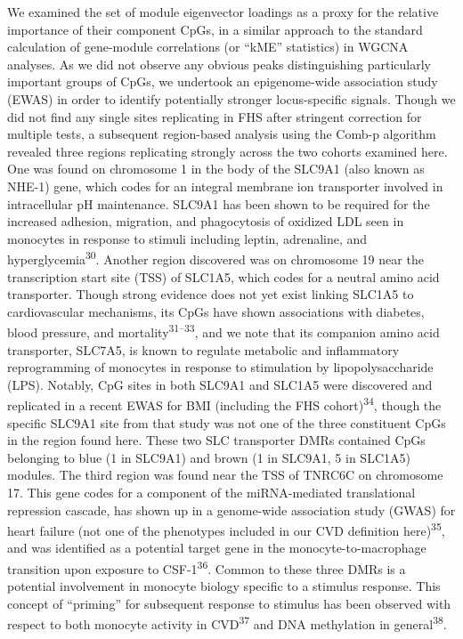 \documentclass[]{article}
\theoremstyle{definition}
\theoremstyle{definition}
\theoremstyle{definition}
\theoremstyle{remark}
\begin{document}
We examined the set of module eigenvector loadings as a proxy for the
relative importance of their component CpGs, in a similar approach to
the standard calculation of gene-module correlations (or ``kME''
statistics) in WGCNA analyses. As we did not observe any obvious peaks
distinguishing particularly important groups of CpGs, we undertook an
epigenome-wide association study (EWAS) in order to identify potentially
stronger locus-specific signals. Though we did not find any single sites
replicating in FHS after stringent correction for multiple tests, a
subsequent region-based analysis using the Comb-p algorithm revealed
three regions replicating strongly across the two cohorts examined here.
One was found on chromosome 1 in the body of the SLC9A1 (also known as
NHE-1) gene, which codes for an integral membrane ion transporter
involved in intracellular pH maintenance. SLC9A1 has been shown to be
required for the increased adhesion, migration, and phagocytosis of
oxidized LDL seen in monocytes in response to stimuli including leptin,
adrenaline, and hyperglycemia\textsuperscript{30}. Another region
discovered was on chromosome 19 near the transcription start site (TSS)
of SLC1A5, which codes for a neutral amino acid transporter. Though
strong evidence does not yet exist linking SLC1A5 to cardiovascular
mechanisms, its CpGs have shown associations with diabetes, blood
pressure, and mortality\textsuperscript{31--33}, and we note that its
companion amino acid transporter, SLC7A5, is known to regulate metabolic
and inflammatory reprogramming of monocytes in response to stimulation
by lipopolysaccharide (LPS). Notably, CpG sites in both SLC9A1 and
SLC1A5 were discovered and replicated in a recent EWAS for BMI
(including the FHS cohort)\textsuperscript{34}, though the specific
SLC9A1 site from that study was not one of the three constituent CpGs in
the region found here. These two SLC transporter DMRs contained CpGs
belonging to blue (1 in SLC9A1) and brown (1 in SLC9A1, 5 in SLC1A5)
modules. The third region was found near the TSS of TNRC6C on chromosome
17. This gene codes for a component of the miRNA-mediated translational
repression cascade, has shown up in a genome-wide association study
(GWAS) for heart failure (not one of the phenotypes included in our CVD
definition here)\textsuperscript{35}, and was identified as a potential
target gene in the monocyte-to-macrophage transition upon exposure to
CSF-1\textsuperscript{36}. Common to these three DMRs is a potential
involvement in monocyte biology specific to a stimulus response. This
concept of ``priming'' for subsequent response to stimulus has been
observed with respect to both monocyte activity in
CVD\textsuperscript{37} and DNA methylation in
general\textsuperscript{38}.
\end{document}
